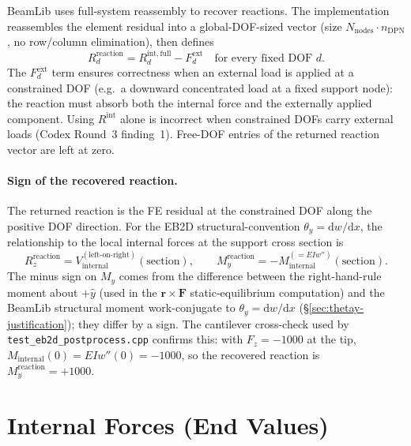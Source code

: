 \documentclass[11pt,a4paper]{article}
\newcommand{\dd}{\mathrm{d}}
\newcommand{\bmath}[1]{\boldsymbol{#1}}
\begin{document}
BeamLib uses full-system reassembly to recover reactions. The implementation reassembles the element residual into a global-DOF-sized vector (size $N_{\text{nodes}} \cdot n_{\text{DPN}}$, no row/column elimination), then defines
\[
R_d^{\mathrm{reaction}} = R_d^{\mathrm{int,full}} - F_d^{\mathrm{ext}}
\quad\text{for every fixed DOF } d.
\]
The $F_d^{\mathrm{ext}}$ term ensures correctness when an external load is applied at a constrained DOF (e.g.\ a downward concentrated load at a fixed support node): the reaction must absorb both the internal force and the externally applied component. Using $R^{\mathrm{int}}$ alone is incorrect when constrained DOFs carry external loads (Codex Round~3 finding~1). Free-DOF entries of the returned reaction vector are left at zero.

\paragraph{Sign of the recovered reaction.}
The returned reaction is the FE residual at the constrained DOF along the positive DOF direction. For the EB2D structural-convention $\theta_y = \dd w/\dd x$, the relationship to the local internal forces at the support cross section is
\[
R_z^{\mathrm{reaction}} = V_{\mathrm{internal}}^{(\text{left-on-right})}(\text{section}),
\qquad
M_y^{\mathrm{reaction}} = -M_{\mathrm{internal}}^{(=EI w'')}(\text{section}).
\]
The minus sign on $M_y$ comes from the difference between the right-hand-rule moment about $+\hat{y}$ (used in the $\bmath{r}\times\bmath{F}$ static-equilibrium computation) and the BeamLib structural moment work-conjugate to $\theta_y = \dd w/\dd x$ (\S\ref{sec:thetay-justification}); they differ by a sign. The cantilever cross-check used by \texttt{test\_eb2d\_postprocess.cpp} confirms this: with $F_z = -1000$ at the tip, $M_{\mathrm{internal}}(0) = EI w''(0) = -1000$, so the recovered reaction is $M_y^{\mathrm{reaction}} = +1000$.

\section{Internal Forces (End Values)}\label{sec:internal-forces}
\end{document}
